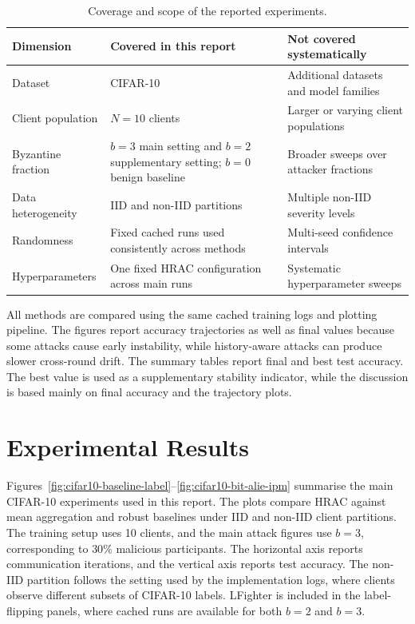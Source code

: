 \begin{table}[t]
    \centering
    \small
    \setlength{\tabcolsep}{4pt}
    \caption{Coverage and scope of the reported experiments.}
    \label{tab:coverage-scope}
    \begin{tabular}{p{}p{}p{}}
        \hline
        \textbf{Dimension} & \textbf{Covered in this report} & \textbf{Not covered systematically} \\
        \hline
        Dataset & CIFAR-10 & Additional datasets and model families \\
        Client population & $N=10$ clients & Larger or varying client populations \\
        Byzantine fraction & $b=3$ main setting and $b=2$ supplementary setting; $b=0$ benign baseline & Broader sweeps over attacker fractions \\
        Data heterogeneity & IID and non-IID partitions & Multiple non-IID severity levels \\
        Randomness & Fixed cached runs used consistently across methods & Multi-seed confidence intervals \\
        Hyperparameters & One fixed HRAC configuration across main runs & Systematic hyperparameter sweeps \\
        \hline
    \end{tabular}
\end{table}

All methods are compared using the same cached training logs and plotting
pipeline. The figures report accuracy trajectories as well as final values
because some attacks cause early instability, while history-aware attacks can
produce slower cross-round drift.
The summary tables report final and best test accuracy. The best value is used
as a supplementary stability indicator, while the discussion is based mainly on
final accuracy and the trajectory plots.

\section{Experimental Results}
\label{sec:experimental-results}

Figures~\ref{fig:cifar10-baseline-label}--\ref{fig:cifar10-bit-alie-ipm}
summarise the main CIFAR-10 experiments used in this report. The plots compare
HRAC against mean aggregation and robust baselines under IID and non-IID client
partitions. The training setup uses 10 clients, and the main attack figures use
$b=3$, corresponding to $30\%$ malicious participants. The horizontal axis
reports communication iterations, and the vertical axis reports test accuracy.
The non-IID partition follows the setting used by the implementation logs,
where clients observe different subsets of CIFAR-10 labels. LFighter is included
in the label-flipping panels, where cached runs are available for both $b=2$ and
$b=3$.

